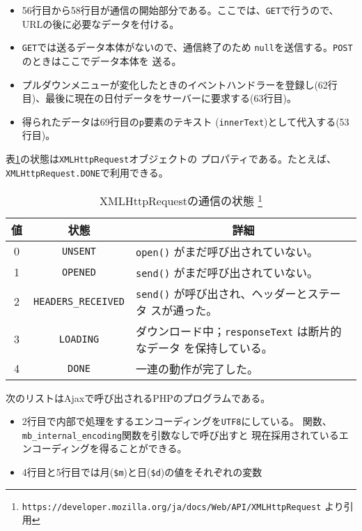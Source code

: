 \begin{Exec}
\begin{itemize}
 \item 56行目から58行目が通信の開始部分である。ここでは、\texttt{GET}で行うので、
       URLの後に必要なデータを付ける。
 \item \texttt{GET}では送るデータ本体がないので、通信終了のため
       \texttt{null}を送信する。\texttt{POST}のときはここでデータ本体を
       送る。
 \item プルダウンメニューが変化したときのイベントハンドラーを登録し(62行
       目)、最後に現在の日付データをサーバーに要求する(63行目)。
 \item 得られたデータは69行目の\texttt{p}要素のテキスト
       (\texttt{innerText})として代入する(53行目)。
\end{itemize}
 表\ref{XMLHttpRequestRes}の状態は\texttt{XMLHttpRequest}オブジェクトの
 プロパティである。たとえば、\texttt{XMLHttpRequest.DONE}で利用できる。
 \begin{table}[ht]
	\caption{XMLHttpRequestの通信の状態
\protect\footnote{\protect\texttt{https://developer.mozilla.org/ja/docs/Web/API/XMLHttpRequest}
	より引用}} \label{XMLHttpRequestRes}
		\begin{tabular}{|c|c|m{}|}\hline
		 値&状態&\multicolumn{1}{c|}{詳細}\\\hline
		 0&\Verb+UNSENT+&\Verb+open()+ がまだ呼び出されていない。\\\hline
1&\Verb+OPENED+&\Verb+send()+ がまだ呼び出されていない。\\\hline
2&\Verb+HEADERS_RECEIVED+&\Verb+send()+ が呼び出され、ヘッダーとステータ
						 スが通った。\\\hline 
3&\Verb+LOADING+&ダウンロード中；\Verb+responseText+ は断片的なデータ
						 を保持している。\\\hline 
4&\Verb+DONE+&一連の動作が完了した。\\\hline
		\end{tabular}
 \end{table}

 次のリストはAjaxで呼び出されるPHPのプログラムである。
\begin{itemize}
 \item 2行目で内部で処理をするエンコーディングを\texttt{UTF8}にしている。
       関数、\texttt{mb\_internal\_encoding}関数を引数なしで呼び出すと
       現在採用されているエンコーディングを得ることができる。
 \item 4行目と5行目では月(\Verb+$m+)と日(\Verb+$d+)の値をそれぞれの変数

\end{itemize}
\end{Exec}
